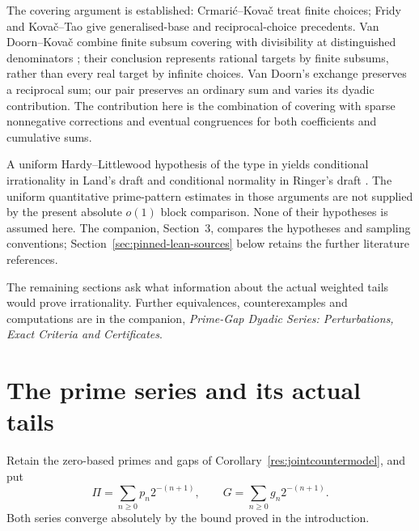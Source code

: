 \documentclass[11pt]{article}
\begin{document}
The covering argument is established: Crmari\'{c}--Kova\v{c}
\cite[Lemma~4]{crmarickovac2025} treat finite choices; Fridy
\cite{fridy1966} and Kova\v{c}--Tao \cite[Lemma~5.1]{kovactao2024}
give generalised-base and reciprocal-choice precedents.
Van Doorn--Kova\v{c} combine finite subsum covering with divisibility at
distinguished denominators \cite[Lemma~7, Proposition~8]{vandoornkovac2025};
their conclusion represents rational targets by finite subsums, rather
than every real target by infinite choices.  Van Doorn's exchange
\cite[proof of Theorem~3]{vandoorn2025} preserves a reciprocal sum;
our pair preserves an ordinary sum and varies its dyadic contribution.
The contribution here is the combination of covering with sparse
nonnegative corrections and eventual congruences for both coefficients
and cumulative sums.

A uniform Hardy--Littlewood hypothesis of the type in
\cite[Conjecture~1.3]{kuperberg2023} yields conditional irrationality in
Land's draft \cite[Theorem~2]{land2026} and conditional normality in
Ringer's draft \cite{ringer2026}.  The uniform quantitative prime-pattern
estimates in those arguments are not supplied by the present absolute
$o(1)$ block comparison.  None of their hypotheses is assumed here.
The companion, Section~3, compares the hypotheses and sampling conventions;
Section~\ref{sec:pinned-lean-sources} below retains the further literature
references.

The remaining sections ask what information about the actual weighted
tails would prove irrationality.  Further equivalences, counterexamples
and computations are in the companion, \emph{Prime-Gap Dyadic Series:
Perturbations, Exact Criteria and Certificates}.

\section{The prime series and its actual tails}\label{sec:parts}
Retain the zero-based primes and gaps of Corollary~\ref{res:jointcountermodel},
and put
\[
 \Pi=\sum_{n\ge0}p_n2^{-(n+1)},\qquad
 G=\sum_{n\ge0}g_n2^{-(n+1)}.
\]
Both series converge absolutely by the bound proved in the introduction.
\end{document}
